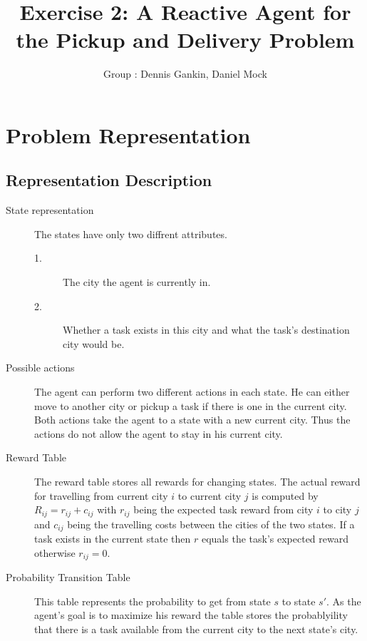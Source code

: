 \documentclass[11pt]{article}
\title{\bf Exercise 2: A Reactive Agent for the Pickup and Delivery Problem}
\author{Group \textnumero 29: Dennis Gankin, Daniel Mock}
\begin{document}
\maketitle

\section{Problem Representation}

\subsection{Representation Description}
\begin{description}
	\item [State representation] The states have only two diffrent attributes.
		\begin{description}
			\item[1.] The city the agent is currently in.
			\item[2.] Whether a task exists in this city and what the task's destination city would be.
		\end{description}
	\item [Possible actions] The agent can perform two different actions in each state. He can either move to another city or pickup a task if there is one in the current city. Both actions take the agent to a state with a new current city. Thus the actions do not allow the agent to stay in his current city.
	\item[Reward Table] The reward table stores all rewards for changing states. The actual reward for travelling from current city \(i\) to current city \(j\) is computed by \(R_{ij}=r_{ij}+c_{ij} \) with  \(r_{ij}\) being the expected task reward from city \(i\) to city \(j\) and \(c_{ij}\) being the travelling costs between the cities of the two states. If a task exists in the current state then \(r\) equals the task's expected reward otherwise \(r_{ij} =0\). 
	\item[Probability Transition Table] This table represents the probability to get from state \(s\) to state \(s'\). As the agent's goal is to maximize his reward the table stores the probablyility that there is a task available from the current city to the next state's city.  
\end{description}
\end{document}
